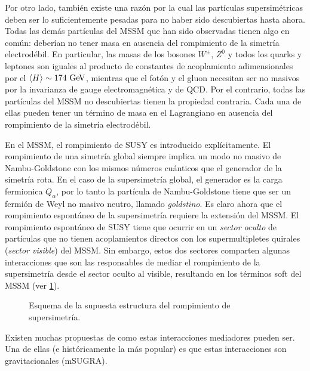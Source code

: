 Por otro lado, también existe una razón por la cual las partículas
supersimétricas deben ser lo suficientemente pesadas para no haber sido
descubiertas hasta ahora. Todas las demás partículas del MSSM que han sido
observadas tienen algo en común: deberían no tener masa en ausencia del
rompimiento de la simetría electrodébil. En particular, las masas de los
bosones $W^\pm$, $Z^0$ y todos los quarks y leptones son iguales al producto de
constantes de acoplamiento adimensionales por el $\avg{H} \sim 174 \gev$,
mientras que el fotón y el gluon necesitan ser no masivos por la invarianza de
gauge electromagnética y de QCD. Por el contrario, todas las partículas del MSSM
no descubiertas tienen la propiedad contraria. Cada una de ellas pueden tener un
término de masa en el Lagrangiano en ausencia del rompimiento de la simetría
electrodébil.

En el MSSM, el rompimiento de SUSY es introducido explícitamente. El rompimiento
de una simetría global siempre implica un modo no masivo de Nambu-Goldstone con
los mismos números cuánticos que el generador de la simetría rota. En el caso de
la supersimetría global, el generador es la carga fermionica $Q_\alpha$, por lo
tanto la partícula de Nambu-Goldstone tiene que ser un fermión de Weyl no masivo
neutro, llamado \emph{goldstino}. Es claro ahora que el rompimiento espontáneo
de la supersimetría requiere la extensión del MSSM. El rompimiento espontáneo de
SUSY tiene que ocurrir en un \emph{sector oculto} de partículas que no tienen
acoplamientos directos con los supermultipletes quirales (\emph{sector visible})
del MSSM. Sin embargo, estos dos sectores comparten algunas interacciones que
son las responsables de mediar el rompimiento de la supersimetría desde el
sector oculto al visible, resultando en los términos soft del MSSM (ver
\cref{fig:susy_breaking}).

\begin{figure}[!htbp]
  \centering
  
  \caption{Esquema de la supuesta estructura del rompimiento de supersimetría.}\label{fig:susy_breaking}
\end{figure}

Existen muchas propuestas de como estas interacciones mediadores pueden ser. Una
de ellas (e históricamente la más popular) es que estas interacciones son
gravitacionales (mSUGRA).


